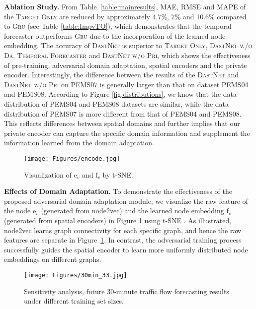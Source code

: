 \documentclass[sigconf]{acmart}
\theoremstyle{definition}
\begin{document}
\noindent\textbf{Ablation Study.}
From Table~\ref{table:mainresults}, MAE, RMSE and MAPE of the \textsc{Target Only} are reduced by approximately 4.7\%, 7\% and 10.6\% compared to \textsc{Gru} (see Table \ref{table:ImpvTO}), which demonstrates that the temporal forecaster outperforms \textsc{Gru} due to the incorporation of the learned node embedding. The accuracy of \textsc{DastNet} is superior to \textsc{Target Only}, \textsc{DastNet w/o Da}, \textsc{Temporal Forecaster} and \textsc{DastNet w/o Pri}, which shows the effectiveness of pre-training, adversarial domain adaptation, spatial encoders and the private encoder. 
Interestingly, the difference between the results of the \textsc{DastNet} and \textsc{DastNet w/o Pri} on PEMS07 is generally larger than that on dataset PEMS04 and PEMS08. According to Figure \ref{fig:distributions}, we know that the data distribution of PEMS04 and PEMS08 datasets are similar, while the data distribution of PEMS07 is more different from that of PEMS04 and PEMS08. This reflects differences between spatial domains and further implies that our private encoder can capture the specific domain information and supplement the information learned from the domain adaptation. 



\begin{figure}[h]
    \centering
    \texttt{[image: Figures/encode.jpg]}
    \caption{Visualization of $\mathrm{e}_v$ and $\mathrm{f}_v$ by t-SNE.}
    \label{fig:encode}
\end{figure}

\noindent\textbf{Effects of Domain Adaptation.}
To demonstrate the effectiveness of the proposed adversarial domain adaptation module, we visualize the raw feature of the node $\mathrm{e}_v$ (generated from node2vec) and the learned node embedding $\mathrm{f}_v$ (generated from spatial encoders) in Figure \ref{fig:encode} using t-SNE \cite{van2013barnes}. As illustrated, node2vec learns graph connectivity for each specific graph, and hence the raw features are separate in Figure~\ref{fig:encode}. In contrast, the adversarial training process successfully guides the spatial encoder to learn more uniformly distributed node embeddings on different graphs.






\begin{figure}[h]
    \centering
    \texttt{[image: Figures/30min\_33.jpg]}
    \caption{Sensitivity analysis, future 30-minute traffic flow forecasting results under different training set sizes.}\label{fig:sensitivity_MAE}
\end{figure}
\end{document}
